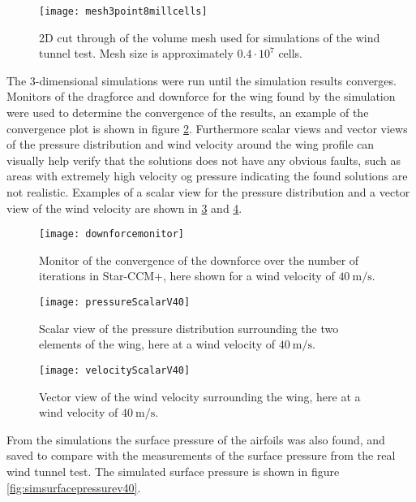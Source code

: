   \begin{figure}
    \texttt{[image: mesh3point8millcells]}
    \caption{2D cut through of the volume mesh used for simulations of the wind tunnel test. Mesh size is approximately $0.4 \cdot 10^{7}$ cells.}
    \label{fig:mesh3point8mill}
  \end{figure}

  The 3-dimensional simulations were run until the simulation results converges. Monitors of the dragforce and downforce for the wing found by the simulation were used to determine the convergence of the results, an example of the convergence plot is shown in figure \ref{fig:downforcemonitor}. Furthermore scalar views and vector views of the pressure distribution and wind velocity around the wing profile can visually help verify that the solutions does not have any obvious faults, such as areas with extremely high velocity og pressure indicating the found solutions are not realistic. Examples of a scalar view for the pressure distribution and a vector view of the wind velocity are shown in \ref{fig:pressureScalarV40} and \ref{fig:velocityScalarV40}.

  \begin{figure}
    \texttt{[image: downforcemonitor]}
    \caption{Monitor of the convergence of the downforce over the number of iterations in Star-CCM+, here shown for a wind velocity of $\SI{40}{\metre\per\second}$.}
    \label{fig:downforcemonitor}
  \end{figure}

  \begin{figure}
    \texttt{[image: pressureScalarV40]}
    \caption{Scalar view of the pressure distribution surrounding the two elements of the wing, here at a wind velocity of $\SI{40}{\metre\per\second}$.}
    \label{fig:pressureScalarV40}
  \end{figure}

  \begin{figure}
    \texttt{[image: velocityScalarV40]}
    \caption{Vector view of the wind velocity surrounding the wing, here at a wind velocity of $\SI{40}{\metre\per\second}$.}
    \label{fig:velocityScalarV40}
  \end{figure}

  From the simulations the surface pressure of the airfoils was also found, and saved to compare with the measurements of the surface pressure from the real wind tunnel test. The simulated surface pressure is shown in figure \ref{fig:simsurfacepressurev40}.

